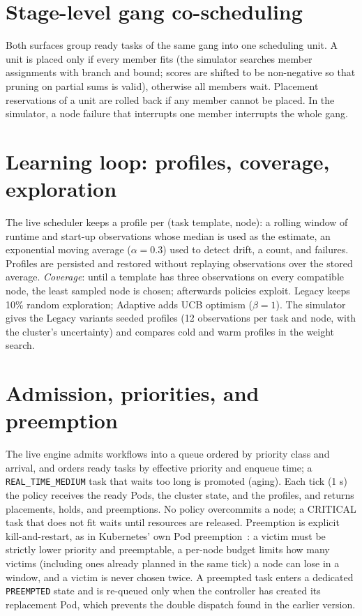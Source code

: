 \documentclass[12pt,a4paper]{report}
\begin{document}
\section{Stage-level gang co-scheduling}

Both surfaces group ready tasks of the same gang into one scheduling unit.
A unit is placed only if every member fits (the simulator searches member
assignments with branch and bound; scores are shifted to be non-negative
so that pruning on partial sums is valid), otherwise all members wait.
Placement reservations of a unit are rolled back if any member cannot be
placed. In the simulator, a node failure that interrupts one member
interrupts the whole gang.

\section{Learning loop: profiles, coverage, exploration}

The live scheduler keeps a profile per (task template, node): a rolling
window of runtime and start-up observations whose median is used as the
estimate, an exponential moving average ($\alpha = 0.3$) used to detect
drift, a count, and failures. Profiles are persisted and restored without
replaying observations over the stored average. \emph{Coverage}: until a
template has three observations on every compatible node, the least
sampled node is chosen; afterwards policies exploit. Legacy keeps 10\%
random exploration; Adaptive adds UCB optimism ($\beta = 1$). The
simulator gives the Legacy variants seeded profiles (12 observations per
task and node, with the cluster's uncertainty) and compares cold and warm
profiles in the weight search.

\section{Admission, priorities, and preemption}

The live engine admits workflows into a queue ordered by priority class
and arrival, and orders ready tasks by effective priority and enqueue
time; a \texttt{REAL\_TIME\_MEDIUM} task that waits too long is promoted
(aging). Each tick (1 s) the policy receives the ready Pods, the
cluster state, and the profiles, and returns placements, holds, and
preemptions. No policy overcommits a node; a CRITICAL task that does not
fit waits until resources are released. Preemption is explicit
kill-and-restart, as in Kubernetes' own Pod
preemption~\cite{kubernetes-preemption}: a victim must be strictly lower
priority and
preemptable, a per-node budget limits how many victims (including ones
already planned in the same tick) a node can lose in a window, and a
victim is never chosen twice. A preempted task enters a dedicated
\texttt{PREEMPTED} state and is re-queued only when the controller has
created its replacement Pod, which prevents the double dispatch found in
the earlier version.
\end{document}
